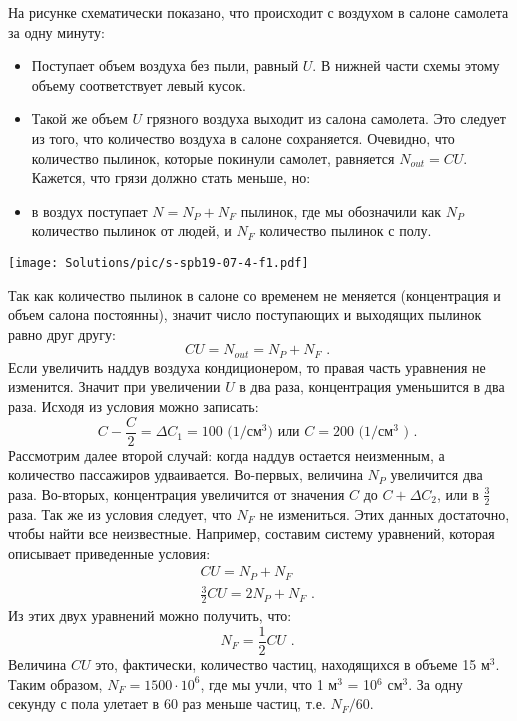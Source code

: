 На рисунке схематически показано, что происходит с воздухом в салоне самолета за одну минуту:
\begin{itemize}
\item Поступает объем воздуха без пыли, равный $U$. В нижней части схемы этому объему соответствует левый кусок.
\item Такой же объем $U$ грязного воздуха выходит из салона самолета. Это следует из того, что количество воздуха в салоне сохраняется. Очевидно, что количество пылинок, которые покинули самолет, равняется $N_{out} = C U$. Кажется, что грязи должно стать меньше, но:
\item в воздух поступает $N = N_P + N_F$ пылинок, где мы обозначили как $N_P$ количество пылинок от людей, и $N_F$ количество пылинок с полу.
\end{itemize}

\begin{center}
\texttt{[image: Solutions/pic/s-spb19-07-4-f1.pdf]}
\end{center}

Так как количество пылинок в салоне со временем не меняется (концентрация и объем салона постоянны), значит число поступающих и выходящих пылинок равно друг другу:
\begin{equation}
C U = N_{out} = N_P + N_F \mbox{ . } \label{eq:spb19_07_04_1}
\end{equation} 
Если увеличить наддув воздуха кондиционером, то правая часть уравнения не изменится. Значит при увеличении $U$ в два раза, концентрация уменьшится в два раза. Исходя из условия можно записать:
\begin{equation}
C - \frac{C}{2} = \Delta C_1 = 100 \mbox{ (} 1/\mbox{см}^{3} \mbox{)  или }  C = 200 \mbox{ (}1/\mbox{см}^{3} \mbox{ )} \mbox{ . }
\end{equation}
Рассмотрим далее второй случай: когда наддув остается неизменным, а количество пассажиров удваивается. Во-первых, величина $N_P$ увеличится два раза. Во-вторых, концентрация увеличится от значения $C$ до $C+\Delta C_2$, или в $\frac{3}{2}$ раза. Так же из условия следует, что $N_F$ не измениться. Этих данных достаточно, чтобы найти все неизвестные. Например, составим систему уравнений, которая описывает приведенные условия:
\begin{eqnarray}
C U = N_P + N_F \\
\frac{3}{2} C U = 2 N_P + N_F \label{eq:spb19_07_04_2} \mbox{ . }
\end{eqnarray}
Из этих двух уравнений можно получить, что:
\begin{equation}
N_F = \frac{1}{2} C U \mbox{ . }
\end{equation}
Величина $C U$ это, фактически, количество частиц, находящихся в объеме 15 м$^3$. Таким образом, $N_F = 1500 \cdot 10^6$, где мы учли, что 1 м$^3$ = 10$^6$ см$^3$. За одну секунду с пола улетает в 60 раз меньше частиц, т.е. $N_F/60$.


